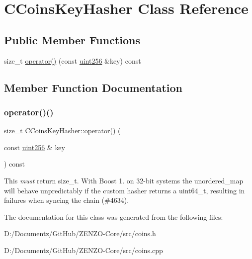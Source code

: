 \hypertarget{class_c_coins_key_hasher}{}\section{C\+Coins\+Key\+Hasher Class Reference}
\label{class_c_coins_key_hasher}
\subsection*{Public Member Functions}
\begin{DoxyCompactItemize}
\item 
size\+\_\+t \mbox{\hyperlink{class_c_coins_key_hasher_abf805e5472a1a3c9c29f8f3f1dd013b3}{operator()}} (const \mbox{\hyperlink{classuint256}{uint256}} \&key) const
\end{DoxyCompactItemize}


\subsection{Member Function Documentation}
\mbox{\label{class_c_coins_key_hasher_abf805e5472a1a3c9c29f8f3f1dd013b3}} 
\subsubsection{\texorpdfstring{operator()()}{operator()()}}
{\footnotesize\ttfamily size\+\_\+t C\+Coins\+Key\+Hasher\+::operator() (\begin{DoxyParamCaption}\item[{const \mbox{\hyperlink{classuint256}{uint256}} \&}]{key }\end{DoxyParamCaption}) const\hspace{0.3cm}{\ttfamily [inline]}}

This {\itshape must} return size\+\_\+t. With Boost 1. on 32-\/bit systems the unordered\+\_\+map will behave unpredictably if the custom hasher returns a uint64\+\_\+t, resulting in failures when syncing the chain (\#4634). 

The documentation for this class was generated from the following files\+:\begin{DoxyCompactItemize}
\item 
D\+:/\+Documentz/\+Git\+Hub/\+Z\+E\+N\+Z\+O-\/\+Core/src/coins.\+h\item 
D\+:/\+Documentz/\+Git\+Hub/\+Z\+E\+N\+Z\+O-\/\+Core/src/coins.\+cpp\end{DoxyCompactItemize}
